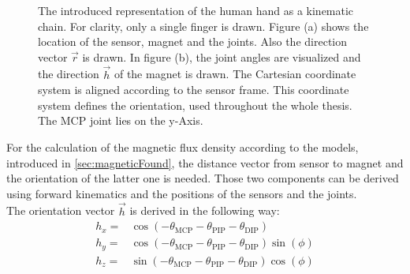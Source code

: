 \begin{figure}[!htb]
\centering
{}
\hfill
{}

\caption[The introduced hand model.]
{The introduced representation of the human hand as a kinematic chain. For clarity, only a single finger is drawn. Figure (a) shows the location of the sensor, magnet and the joints. Also the direction vector $ \vec{r} $ is drawn. In figure (b), the joint angles are visualized and the direction $ \vec{h} $ of the magnet is drawn. The Cartesian coordinate system is aligned according to the sensor frame. This coordinate system defines the orientation, used throughout the whole thesis. The \ac{MCP} joint lies on the y-Axis.}
\label{fig:handMod}
\FloatBarrier
\end{figure}
For the calculation of the magnetic flux density according to the models, introduced in \ref{sec:magneticFound}, the distance vector from sensor to magnet and the orientation of the latter one is needed. Those two components can be derived using forward kinematics and the positions of the sensors and the joints.\\
The orientation vector $ \vec{h} $ is derived in the following way:
\begin{equation}\label{eq:orienH}
\begin{aligned}
h_{x} =& \cos(-\theta_{\mathrm{MCP}}-\theta_{\mathrm{PIP}}-\theta_{\mathrm{DIP}})\\[3pt]
h_{y} =& \cos(-\theta_{\mathrm{MCP}}-\theta_{\mathrm{PIP}}-\theta_{\mathrm{DIP}})\sin(\phi)\\[3pt]
h_{z} =& \sin(-\theta_{\mathrm{MCP}}-\theta_{\mathrm{PIP}}-\theta_{\mathrm{DIP}})\cos(\phi)
\end{aligned}
\end{equation}

